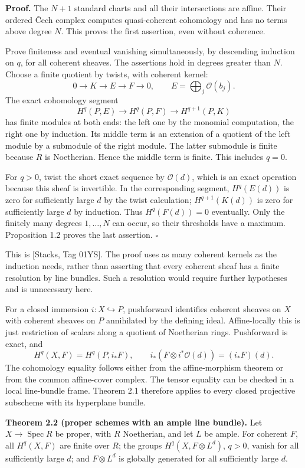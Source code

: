 \documentclass[11pt]{article}
\begin{document}
\textbf{Proof.} The \(N+1\) standard charts and all their intersections
are affine. Their ordered Čech complex computes quasi-coherent
cohomology and has no terms above degree \(N\). This proves the first
assertion, even without coherence.

Prove finiteness and eventual vanishing simultaneously, by descending
induction on \(q\), for all coherent sheaves. The assertions hold in
degrees greater than \(N\). Choose a finite quotient by twists, with
coherent kernel: \[
0\longrightarrow K\longrightarrow E\longrightarrow F\longrightarrow0,
\qquad E=\bigoplus_j\mathcal O(b_j).
\] The exact cohomology segment \[
H^q(P,E)\longrightarrow H^q(P,F)\longrightarrow H^{q+1}(P,K)
\] has finite modules at both ends: the left one by the monomial
computation, the right one by induction. Its middle term is an extension
of a quotient of the left module by a submodule of the right module. The
latter submodule is finite because \(R\) is Noetherian. Hence the middle
term is finite. This includes \(q=0\).

For \(q>0\), twist the short exact sequence by \(\mathcal O(d)\), which
is an exact operation because this sheaf is invertible. In the
corresponding segment, \(H^q(E(d))\) is zero for sufficiently large
\(d\) by the twist calculation; \(H^{q+1}(K(d))\) is zero for
sufficiently large \(d\) by induction. Thus \(H^q(F(d))=0\) eventually.
Only the finitely many degrees \(1,\ldots,N\) can occur, so their
thresholds have a maximum. Proposition 1.2 proves the last assertion.
\(\square\)

This is {[}Stacks, Tag 01YS{]}. The proof uses as many coherent kernels
as the induction needs, rather than asserting that every coherent sheaf
has a finite resolution by line bundles. Such a resolution would require
further hypotheses and is unnecessary here.

For a closed immersion \(i:X\hookrightarrow P\), pushforward identifies
coherent sheaves on \(X\) with coherent sheaves on \(P\) annihilated by
the defining ideal. Affine-locally this is just restriction of scalars
along a quotient of Noetherian rings. Pushforward is exact, and \[
H^q(X,F)=H^q(P,i_*F),\qquad
i_*(F\otimes i^*\mathcal O(d))=(i_*F)(d).
\] The cohomology equality follows either from the affine-morphism
theorem or from the common affine-cover complex. The tensor equality can
be checked in a local line-bundle frame. Theorem 2.1 therefore applies
to every closed projective subscheme with its hyperplane bundle.

\textbf{Theorem 2.2 (proper schemes with an ample line bundle).} Let
\(X\to\operatorname{Spec}R\) be proper, with \(R\) Noetherian, and let
\(L\) be ample. For coherent \(F\), all \(H^q(X,F)\) are finite over
\(R\); the groups \(H^q(X,F\otimes L^d)\), \(q>0\), vanish for all
sufficiently large \(d\); and \(F\otimes L^d\) is globally generated for
all sufficiently large \(d\).
\end{document}
